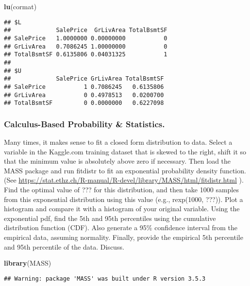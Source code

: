\documentclass[]{article}
\newenvironment{Shaded}{\begin{snugshade}}{\end{snugshade}}
\newcommand{\KeywordTok}[1]{\textcolor[rgb]{0.13,0.29,0.53}{\textbf{#1}}}
\newcommand{\NormalTok}[1]{#1}
\begin{document}
\begin{Shaded}
\begin{Highlighting}[]
\KeywordTok{lu}\NormalTok{(cormat)}
\end{Highlighting}
\end{Shaded}

\begin{verbatim}
## $L
##             SalePrice  GrLivArea TotalBsmtSF
## SalePrice   1.0000000 0.00000000           0
## GrLivArea   0.7086245 1.00000000           0
## TotalBsmtSF 0.6135806 0.04031325           1
## 
## $U
##             SalePrice GrLivArea TotalBsmtSF
## SalePrice           1 0.7086245   0.6135806
## GrLivArea           0 0.4978513   0.0200700
## TotalBsmtSF         0 0.0000000   0.6227098
\end{verbatim}

\subsubsection{Calculus-Based Probability \&
Statistics.}\label{calculus-based-probability-statistics.}

Many times, it makes sense to fit a closed form distribution to data.
Select a variable in the Kaggle.com training dataset that is skewed to
the right, shift it so that the minimum value is absolutely above zero
if necessary. Then load the MASS package and run fitdistr to fit an
exponential probability density function. (See
\url{https://stat.ethz.ch/R-manual/R-devel/library/MASS/html/fitdistr.html}
). Find the optimal value of ??? for this distribution, and then take
1000 samples from this exponential distribution using this value (e.g.,
rexp(1000, ???)). Plot a histogram and compare it with a histogram of
your original variable. Using the exponential pdf, find the 5th and 95th
percentiles using the cumulative distribution function (CDF). Also
generate a 95\% confidence interval from the empirical data, assuming
normality. Finally, provide the empirical 5th percentile and 95th
percentile of the data. Discuss.

\begin{Shaded}
\begin{Highlighting}[]
\KeywordTok{library}\NormalTok{(MASS)}
\end{Highlighting}
\end{Shaded}

\begin{verbatim}
## Warning: package 'MASS' was built under R version 3.5.3
\end{verbatim}
\end{document}

